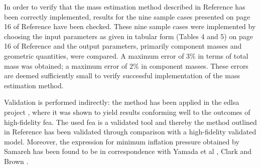 In order to verify that the mass estimation method described in Reference \cite{Samareh2011} has been correctly implemented, results for the nine sample cases presented on page 16 of Reference \cite{Samareh2011} have been checked. These nine sample cases were implemented by choosing the input parameters as given in tabular form (Tables 4 and 5) on page 16 of Reference \cite{Samareh2011} and the output parameters, primarily component masses and geometric quantities, were compared. A maximum error of $3\%$ in terms of total mass was obtained; a maximum error of $2\%$ in component masses. These errors are deemed sufficiently small to verify successful implementation of the mass estimation method.

Validation is performed indirectly: the method \cite{Samareh2011} has been applied in the \gls{edlsa} project \cite{Cianciolo2010}, where it was shown to yield results conforming well to the outcomes of high-fidelity \gls{fea}. The used \gls{fea} is a validated tool \cite{Cianciolo2010} and thereby the method outlined in Reference \cite{Samareh2011} has been validated through comparison with a high-fidelity validated model. Moreover, the expression for minimum inflation pressure obtained by Samareh has been found to be in correspondence with Yamada et al \cite{Yamada2009}, Clark \cite{Clark2009} and Brown \cite{Brown2009}.



